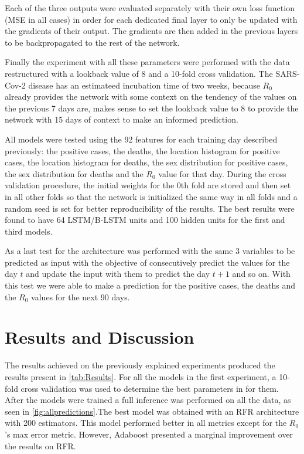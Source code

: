 \documentclass[anon]{CI}
\begin{document}
Each of the three outputs were evaluated separately with their own loss function (MSE in all cases) in order for each dedicated final layer to only be updated with the gradients of their output. The gradients are then added in the previous layers to be backpropagated to the rest of the network.

Finally the experiment with all these parameters were performed with the data restructured with a lookback value of 8 and a 10-fold cross validation. The SARS-Cov-2 disease has an estimateed incubation time of two weeks, because $R_{0}$ already provides the network with some context on the tendency of the values on the previous 7 days are, makes sense to set the lookback value to 8 to provide the network with 15 days of context to make an informed prediction.

All models were tested using the 92 features for each training day described previously: the positive cases, the deaths, the location histogram for positive cases, the location histogram for deaths, the sex distribution for positive cases, the sex distribution for deaths and the $R_0$ value for that day. During the cross validation procedure, the initial weights for the 0th fold are stored and then set in all other folds so that the network is initialized the same way in all folds and a random seed is set for better reproducibility of the results. The best results were found to have 64 LSTM/B-LSTM units and 100 hidden units for the first and third models.

As a last test for the architecture was performed with the same 3 variables to be predicted as input with the objective of consecutively predict the values for the day $t$ and update the input with them to predict the day $t+1$ and so on. With this test we were able to make a prediction for the positive cases, the deaths and the $R_0$ values for the next 90 days.


\section{Results and Discussion}

The results achieved on the previously explained experiments produced the results present in \ref{tab:Results}. For all the models in the first experiment, a 10-fold cross validation was used to determine the best parameters in for them. After the models were trained a full inference was performed on all the data, as seen in \ref{fig:allpredictions}.The best model was obtained with an RFR architecture with 200 estimators. This model performed better in all metrics except for the $R_0$'s max error metric. However, Adaboost presented a marginal improvement over the results on RFR. 
\end{document}
